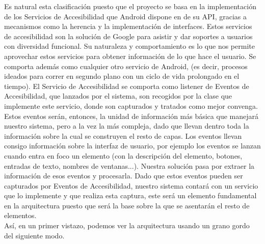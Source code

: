 \documentclass[12pt,a4paper,oneside]{book} %
\begin{document}
Es natural esta clasificación puesto que el proyecto se basa en la implementación de los Servicios de Accesibilidad que Android dispone en de su API, gracias a mecanismos como la herencia y la implementación de interfaces. 
\newline \newline
Estos servicios de accesibilidad son la solución de Google para asistir y dar soportes a usuarios con diversidad funcional. Su naturaleza y comportamiento es lo que nos permite aprovechar estos servicios para obtener información de lo que hace el usuario. 
\newline \newline
Se comporta además como cualquier otro servicio de Android, (es decir, procesos ideados para correr en segundo plano con un ciclo de vida prolongado en el tiempo). El Servicio de Accesibilidad se comporta como listener de Eventos de Accesibilidad, que lanzados por el sistema, son recogidos por la clase que implemente este servicio, donde son capturados y tratados como mejor convenga. Estos eventos serán, entonces, la unidad de información más básica que manejará nuestro sistema, pero a la vez la más compleja, dado que llevan dentro toda la información sobre la cual se construyen el resto de capas.
\newline \newline
Los eventos llevan consigo información sobre la interfaz de usuario, por ejemplo los eventos se lanzan cuando entra en foco un elemento (con la descripción del elemento, botones, entradas de texto, nombres de ventanas...). Nuestra solución pasa por extraer la información de esos eventos y procesarla. 
\newline \newline
Dado que estos eventos pueden ser capturados por Eventos de Accesibilidad, nuestro sistema contará con un servicio que lo implemente y que realiza esta captura, este será un elemento fundamental en la arquitectura puesto que será la base sobre la que se asentarán el resto de elementos. 
\\
Así, en un primer vistazo, podemos ver la arquitectura usando un grano gordo del siguiente modo. 
\end{document}
